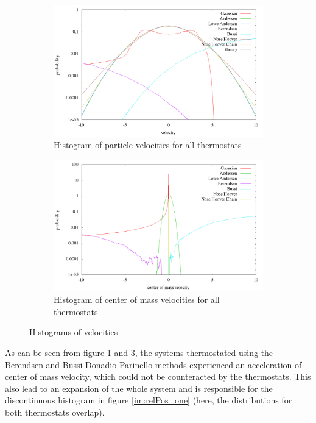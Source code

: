\begin{figure}[H]
\centering
  \begin{subfigure}[b]{0.5\textwidth}
  	\includegraphics[width=\linewidth]{./graphics/Histogramm_velocity_one_T=20_p=64.png}
  	\caption{Histogram of particle velocities for all thermostats}
    \label{im:vel_one}
  \end{subfigure}\hfill
  \begin{subfigure}[b]{0.5\textwidth}
    \includegraphics[width=\linewidth]{./graphics/Histogramm_schwerVel_one_T=20_p=64.png}
    \caption{Histogram of center of mass velocities for all thermostats}
    \label{im:schwerVel_one} 
  \end{subfigure}
  \caption{Histograms of velocities}
\end{figure}

As can be seen from figure \ref{im:vel_one} and \ref{im:schwerVel_one}, the systems thermostated using the Berendsen and Bussi-Donadio-Parinello methods experienced an acceleration of center of mass velocity, which could not be counteracted by the thermostats. This also lead to an expansion of the whole system and is responsible for the discontinuous histogram in figure \ref{im:relPos_one} (here, the distributions for both thermostats overlap).

